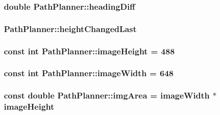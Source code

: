 \subsubsection[{\texorpdfstring{heading\+Diff}{headingDiff}}]{\setlength{\rightskip}{0pt plus 5cm}double Path\+Planner\+::heading\+Diff}\hypertarget{classPathPlanner_a074f33607f0c0bb7a303e80d52ce79b4}{}\label{classPathPlanner_a074f33607f0c0bb7a303e80d52ce79b4}
\subsubsection[{\texorpdfstring{height\+Changed\+Last}{heightChangedLast}}]{ Path\+Planner\+::height\+Changed\+Last}\hypertarget{classPathPlanner_ab851d5039b0392d1895ee42960e29b2d}{}\label{classPathPlanner_ab851d5039b0392d1895ee42960e29b2d}
\subsubsection[{\texorpdfstring{image\+Height}{imageHeight}}]{\setlength{\rightskip}{0pt plus 5cm}const int Path\+Planner\+::image\+Height = 488}\hypertarget{classPathPlanner_a83b54a87f884285d41642702c46368a8}{}\label{classPathPlanner_a83b54a87f884285d41642702c46368a8}
\subsubsection[{\texorpdfstring{image\+Width}{imageWidth}}]{\setlength{\rightskip}{0pt plus 5cm}const int Path\+Planner\+::image\+Width = 648}\hypertarget{classPathPlanner_ab562d2e58308fd42088587858d7193ab}{}\label{classPathPlanner_ab562d2e58308fd42088587858d7193ab}
\subsubsection[{\texorpdfstring{img\+Area}{imgArea}}]{\setlength{\rightskip}{0pt plus 5cm}const double Path\+Planner\+::img\+Area = {\bf image\+Width} $\ast$ {\bf image\+Height}}\hypertarget{classPathPlanner_aa95f3eb27d53bdf487145755a0cb85c9}{}\label{classPathPlanner_aa95f3eb27d53bdf487145755a0cb85c9}
